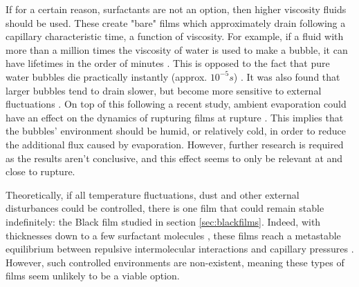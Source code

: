 \documentclass[a4paper,12pt]{article}
\numberwithin{equation}{section}
\numberwithin{figure}{section}
\numberwithin{table}{section}
\begin{document}
If for a certain reason, surfactants are not an option, then higher viscosity fluids should be used. These create "bare" films which approximately drain following a capillary characteristic time, a function of viscosity. For example, if a fluid with more than a million times the viscosity of water is used to make a bubble, it can have lifetimes in the order of minutes \cite{Debregeas1998}. This is opposed to the fact that pure water bubbles die practically instantly (approx. $10^{-5} s$) \cite{Lhuissier2011}. It was also found that larger bubbles tend to drain slower, but become more sensitive to external fluctuations \cite{Debregeas1998}. On top of this following a recent study, ambient evaporation could have an effect on the dynamics of rupturing films at rupture \cite{ChampougnyEvap2018}. This implies that the bubbles' environment should be humid, or relatively cold, in order to reduce the additional flux caused by evaporation. However, further research is required as the results aren't conclusive, and this effect seems to only be relevant at and close to rupture.

Theoretically, if all temperature fluctuations, dust and other external disturbances could be controlled, there is one film that could remain stable indefinitely: the Black film studied in section \ref{sec:blackfilms}. Indeed, with thicknesses down to a few surfactant molecules \cite{Casteletto2003}, these films reach a metastable equilibrium between repulsive intermolecular interactions and capillary pressures \cite{Breward2002, ChampougnyEvap2018, Cantat2010, Vrij1968, VrijDiscussion1966}. However, such controlled environments are non-existent, meaning these types of films seem unlikely to be a viable option.

\end{document}

